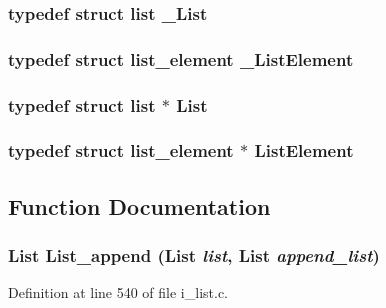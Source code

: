 \subsubsection{\setlength{\rightskip}{0pt plus 5cm}typedef struct \bf{list}  \bf{\_\-List}}\label{i__list_8h_0e9fe722614ff04603c27c7839569e13}


\subsubsection{\setlength{\rightskip}{0pt plus 5cm}typedef struct \bf{list\_\-element}  \bf{\_\-List\-Element}}\label{i__list_8h_af477a2898448e4ac4425610734850c6}


\subsubsection{\setlength{\rightskip}{0pt plus 5cm}typedef struct \bf{list}
 $\ast$ \bf{List}}\label{i__list_8h_0e4de78b4d6f0f8be5a8ebf92cfd40d1}


\subsubsection{\setlength{\rightskip}{0pt plus 5cm}typedef struct \bf{list\_\-element}
 $\ast$ \bf{List\-Element}}\label{i__list_8h_d7544a790915cda316c73a62ab3f2668}




\subsection{Function Documentation}
\subsubsection{\setlength{\rightskip}{0pt plus 5cm}\bf{List} List\_\-append (\bf{List} {\em list}, \bf{List} {\em append\_\-list})}\label{i__list_8h_9b1bc5db9e5edd6e1220a16eeebaf6a3}




Definition at line 540 of file i\_\-list.c.

